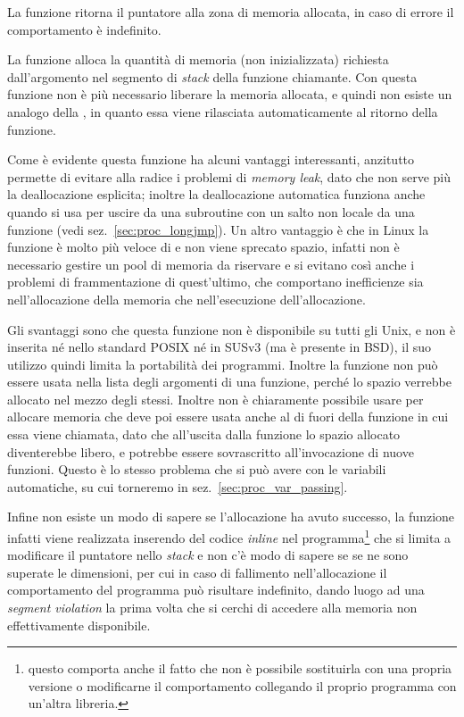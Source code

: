 \begin{funcproto}{ 
}
{La funzione ritorna il puntatore alla zona di memoria allocata, in caso
  di errore il comportamento è indefinito.}
\end{funcproto}

La funzione alloca la quantità di memoria (non inizializzata) richiesta
dall'argomento  nel segmento di \textit{stack} della funzione
chiamante. Con questa funzione non è più necessario liberare la memoria
allocata, e quindi non esiste un analogo della , in quanto essa
viene rilasciata automaticamente al ritorno della funzione.

Come è evidente questa funzione ha alcuni vantaggi interessanti, anzitutto
permette di evitare alla radice i problemi di \textit{memory leak}, dato che
non serve più la deallocazione esplicita; inoltre la deallocazione automatica
funziona anche quando si usa  per uscire da una subroutine con
un salto non locale da una funzione (vedi sez.~\ref{sec:proc_longjmp}).  Un
altro vantaggio è che in Linux la funzione è molto più veloce di 
e non viene sprecato spazio, infatti non è necessario gestire un pool di
memoria da riservare e si evitano così anche i problemi di frammentazione di
quest'ultimo, che comportano inefficienze sia nell'allocazione della memoria
che nell'esecuzione dell'allocazione.

Gli svantaggi sono che questa funzione non è disponibile su tutti gli Unix, e
non è inserita né nello standard POSIX né in SUSv3 (ma è presente in BSD), il
suo utilizzo quindi limita la portabilità dei programmi. Inoltre la funzione
non può essere usata nella lista degli argomenti di una funzione, perché lo
spazio verrebbe allocato nel mezzo degli stessi. Inoltre non è chiaramente
possibile usare  per allocare memoria che deve poi essere usata
anche al di fuori della funzione in cui essa viene chiamata, dato che
all'uscita dalla funzione lo spazio allocato diventerebbe libero, e potrebbe
essere sovrascritto all'invocazione di nuove funzioni.  Questo è lo stesso
problema che si può avere con le variabili automatiche, su cui torneremo in
sez.~\ref{sec:proc_var_passing}.

Infine non esiste un modo di sapere se l'allocazione ha avuto successo, la
funzione infatti viene realizzata inserendo del codice \textit{inline} nel
programma\footnote{questo comporta anche il fatto che non è possibile
  sostituirla con una propria versione o modificarne il comportamento
  collegando il proprio programma con un'altra libreria.} che si limita a
modificare il puntatore nello \textit{stack} e non c'è modo di sapere se se ne
sono superate le dimensioni, per cui in caso di fallimento nell'allocazione il
comportamento del programma può risultare indefinito, dando luogo ad una
\textit{segment violation} la prima volta che si cerchi di accedere alla
memoria non effettivamente disponibile.

